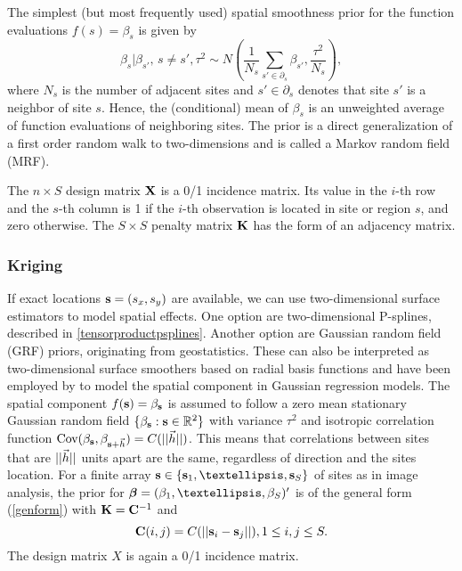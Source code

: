 \documentclass[11pt,a4paper,twoside]{bayesxarticle}
\begin{document}
The simplest (but most frequently used) spatial smoothness prior for
the function evaluations $f(s)=\beta_{s}$ is given by
\begin{equation}
\label{adjacency} \beta_{s} | \beta_{s'}, \, {s \neq
s'},\tau^2 \sim N \left( \frac{1}{N_s} \sum_{s' \in \partial_s}
\beta_{s'} , \frac{\tau^2}{N_s} \right),
\end{equation}
where $N_s$ is the number of adjacent sites and $s' \in
\partial_s$ denotes that site $s'$ is a neighbor of site $s$. Hence,
the (conditional) mean of $\beta_{s}$ is an unweighted average of
function evaluations of neighboring sites. The prior is a direct
generalization of a first order random walk to two-dimensions and is
called a Markov random field (MRF).

The $n \times S$ design matrix $\mathbf{X}$ is a 0/1 incidence matrix. Its
value in the $i$-th row and the $s$-th column is 1 if the $i$-th
observation is located in site or region $s$, and zero otherwise.
The $S \times S$ penalty matrix $\mathbf{K}$ has the form of an adjacency
matrix.

\subsubsection{Kriging}

If exact locations $\mathbf{s}=(s_x,s_y)$ are available, we can use two-dimensional surface estimators to model spatial effects. One
option are two-dimensional P-splines, described in \autoref{tensorproductpsplines}. Another option are Gaussian random field
(GRF) priors, originating from geostatistics. These can also be interpreted as two-dimensional surface smoothers based on
radial basis functions and have been employed by  to model the spatial component in Gaussian regression
models. The spatial component $f(\mathbf{s})=\beta_{\mathbf{s}}$ is assumed to follow a zero mean stationary Gaussian random field
$\{\beta_{\mathbf{s}}:\mathbf{s}\in\mathbb{R}^2\}$ with variance $\tau^2$ and isotropic correlation function
$\mbox{Cov}(\beta_{\mathbf{s}},\beta_{\mathbf{s}+\vec{h}})=C(||\vec{h}||)$. This means that correlations between sites that are $||\vec{h}||$ units
apart are the same, regardless of direction and the sites location. For a finite array $\svec\in\{\svec_1,\ldots,\svec_S\}$ of
sites as in image analysis, the prior for $\betavec=(\beta_1,\ldots,\beta_S)'$ is of the general form (\ref{genform}) with
$\mathbf{K}=\mathbf{C}^{-1}$ and
\[\mathbf{C}(i,j)=C(||\mathbf{s}_i-\mathbf{s}_j||), 1\le i,j\le S.\]
The design matrix $X$ is again a 0/1 incidence matrix.
\end{document}
